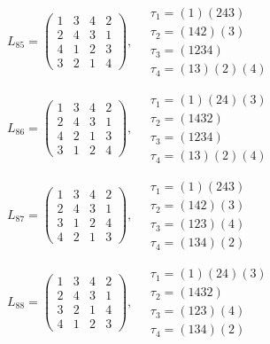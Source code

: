 $L_{85} = \begin{pmatrix} 1 & 3 & 4 & 2 \\ 2 & 4 & 3 & 1 \\ 4 & 1 & 2 & 3 \\ 3 & 2 & 1 & 4 \end{pmatrix}, \quad \begin{matrix} \tau_{1} = (1)(2 4 3) \\ \tau_{2} = (1 4 2)(3) \\ \tau_{3} = (1 2 3 4) \\ \tau_{4} = (1 3)(2)(4) \end{matrix}$

$L_{86} = \begin{pmatrix} 1 & 3 & 4 & 2 \\ 2 & 4 & 3 & 1 \\ 4 & 2 & 1 & 3 \\ 3 & 1 & 2 & 4 \end{pmatrix}, \quad \begin{matrix} \tau_{1} = (1)(2 4)(3) \\ \tau_{2} = (1 4 3 2) \\ \tau_{3} = (1 2 3 4) \\ \tau_{4} = (1 3)(2)(4) \end{matrix}$

$L_{87} = \begin{pmatrix} 1 & 3 & 4 & 2 \\ 2 & 4 & 3 & 1 \\ 3 & 1 & 2 & 4 \\ 4 & 2 & 1 & 3 \end{pmatrix}, \quad \begin{matrix} \tau_{1} = (1)(2 4 3) \\ \tau_{2} = (1 4 2)(3) \\ \tau_{3} = (1 2 3)(4) \\ \tau_{4} = (1 3 4)(2) \end{matrix}$

$L_{88} = \begin{pmatrix} 1 & 3 & 4 & 2 \\ 2 & 4 & 3 & 1 \\ 3 & 2 & 1 & 4 \\ 4 & 1 & 2 & 3 \end{pmatrix}, \quad \begin{matrix} \tau_{1} = (1)(2 4)(3) \\ \tau_{2} = (1 4 3 2) \\ \tau_{3} = (1 2 3)(4) \\ \tau_{4} = (1 3 4)(2) \end{matrix}$

